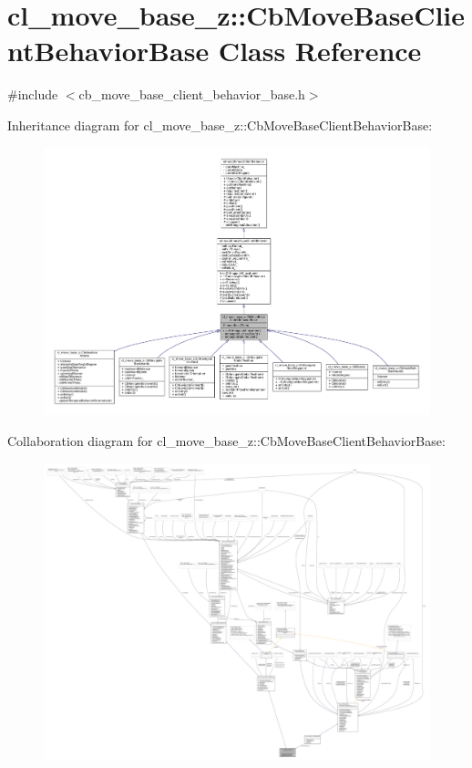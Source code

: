 \hypertarget{classcl__move__base__z_1_1CbMoveBaseClientBehaviorBase}{}\section{cl\+\_\+move\+\_\+base\+\_\+z\+:\+:Cb\+Move\+Base\+Client\+Behavior\+Base Class Reference}
\label{classcl__move__base__z_1_1CbMoveBaseClientBehaviorBase}


{\ttfamily \#include $<$cb\+\_\+move\+\_\+base\+\_\+client\+\_\+behavior\+\_\+base.\+h$>$}



Inheritance diagram for cl\+\_\+move\+\_\+base\+\_\+z\+:\+:Cb\+Move\+Base\+Client\+Behavior\+Base\+:
\nopagebreak
\begin{figure}[H]
\begin{center}
\leavevmode
\includegraphics[width=350pt]{classcl__move__base__z_1_1CbMoveBaseClientBehaviorBase__inherit__graph}
\end{center}
\end{figure}


Collaboration diagram for cl\+\_\+move\+\_\+base\+\_\+z\+:\+:Cb\+Move\+Base\+Client\+Behavior\+Base\+:
\nopagebreak
\begin{figure}[H]
\begin{center}
\leavevmode
\includegraphics[width=350pt]{classcl__move__base__z_1_1CbMoveBaseClientBehaviorBase__coll__graph}
\end{center}
\end{figure}
